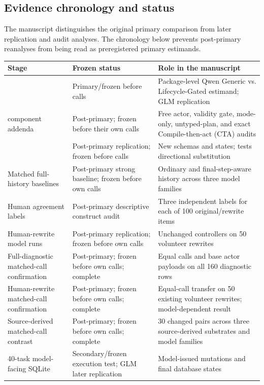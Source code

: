 \documentclass[10pt]{article}
\begin{document}
\subsection{Evidence chronology and status}
The manuscript distinguishes the original primary comparison from later replication and audit
analyses. The chronology below prevents post-primary reanalyses from being read as preregistered
primary estimands.

\begin{table}[H]
\centering
\small
\begin{tabular}{p{}p{}p{}}
\toprule
Stage & Frozen status & Role in the manuscript \\
\midrule
\PrimaryDiagnostic{} & Primary/frozen before calls & Package-level Qwen Generic vs. Lifecycle-Gated estimand; GLM replication \\
\PrimaryDiagnostic{} component addenda & Post-primary; frozen before their own calls & Free actor, validity gate, mode-only, untyped-plan, and exact Compile-then-act (CTA) audits \\
\NewSchemaReplication{} & Post-primary replication; frozen before calls & New schemas and states; tests directional substitution \\
Matched full-history baselines & Post-primary strong baseline; frozen before own calls & Ordinary and final-step-aware history across three model families \\
Human agreement labels & Post-primary descriptive construct audit & Three independent labels for each of 100 original/rewrite items \\
Human-rewrite model runs & Post-primary replication; frozen before own calls & Unchanged controllers on 50 volunteer rewrites \\
Full-diagnostic matched-call confirmation & Post-primary; frozen before own calls; complete & Equal calls and base actor payloads on all 160 diagnostic rows \\
Human-rewrite matched-call confirmation & Post-primary; frozen before own calls; complete & Equal-call transfer on 50 existing volunteer rewrites; model-dependent result \\
Source-derived matched-call contrast & Post-primary; frozen before own calls; complete & 30 changed pairs across three source-derived substrates and model families \\
40-task model-facing SQLite & Secondary/frozen execution test; GLM later replication & Model-issued mutations and final database states \\

\end{tabular}
\end{table}
\end{document}
